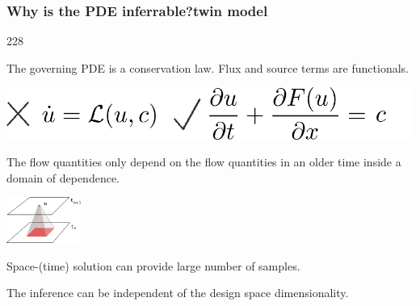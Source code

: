 \documentclass{beamer}
\newcommand{\barrow}{\item[\color{darkred}\ding{228}]}
\begin{document}
\begin{frame}
    \frametitle{Why is the PDE inferrable?\hfill \scriptsize{twin model}}\small
    \begin{dinglist}{228}
        \barrow The governing PDE is a conservation law. Flux and source terms are functionals.\\
        \vspace{-.1cm}
        \begin{center}
            \includegraphics[height=.6cm]{two_eqn.png}
        \end{center}
        \vspace{-.1cm}
        \barrow The flow quantities only depend on the flow quantities in an older time
                inside a domain of dependence.\\
        \vspace{-.1cm}
        \begin{center}
            \includegraphics[height=1.5cm]{locality.png}
        \end{center}
        \vspace{-.1cm}
        \barrow Space-(time) solution can provide large number of samples.
        \barrow The inference can be independent of the design space dimensionality.
    \end{dinglist}
\end{frame}
\end{document}
